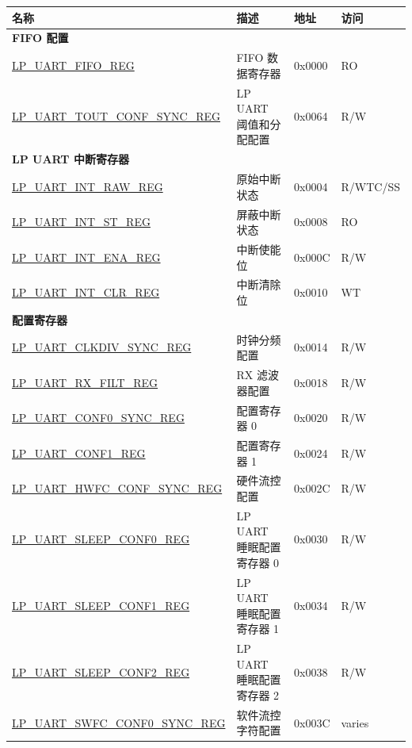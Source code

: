 \begin{longtable}{ | p{6.5cm} | p{7cm} | p{1.3cm} | p{1cm} | }
\hline\rowcolor{lightgray}
名称 & 描述 &  地址 & 访问 \\ \hline
\endhead
\multicolumn{4}{|l|}{\textbf{FIFO 配置}} \\ \hline
\hyperref[regdesc:LPUARTFIFOREG]{LP\_UART\_FIFO\_REG} & FIFO 数据寄存器 & 0x0000 & RO \\ \hline
\hyperref[regdesc:LPUARTTOUTCONFSYNCREG]{LP\_UART\_TOUT\_CONF\_SYNC\_REG} & LP UART 阈值和分配配置 & 0x0064 & R/W \\ \hline
\multicolumn{4}{|l|}{\textbf{LP UART 中断寄存器}} \\ \hline
\hyperref[regdesc:LPUARTINTRAWREG]{LP\_UART\_INT\_RAW\_REG} & 原始中断状态 & 0x0004 & R/WTC/SS \\ \hline
\hyperref[regdesc:LPUARTINTSTREG]{LP\_UART\_INT\_ST\_REG} & 屏蔽中断状态 & 0x0008 & RO \\ \hline
\hyperref[regdesc:LPUARTINTENAREG]{LP\_UART\_INT\_ENA\_REG} & 中断使能位 & 0x000C & R/W \\ \hline
\hyperref[regdesc:LPUARTINTCLRREG]{LP\_UART\_INT\_CLR\_REG} & 中断清除位 & 0x0010 & WT \\ \hline
\multicolumn{4}{|l|}{\textbf{配置寄存器}} \\ \hline
\hyperref[regdesc:LPUARTCLKDIVSYNCREG]{LP\_UART\_CLKDIV\_SYNC\_REG} & 时钟分频配置 & 0x0014 & R/W \\ \hline
\hyperref[regdesc:LPUARTRXFILTREG]{LP\_UART\_RX\_FILT\_REG} & RX 滤波器配置 & 0x0018 & R/W \\ \hline
\hyperref[regdesc:LPUARTCONF0SYNCREG]{LP\_UART\_CONF0\_SYNC\_REG} & 配置寄存器 0 & 0x0020 & R/W \\ \hline
\hyperref[regdesc:LPUARTCONF1REG]{LP\_UART\_CONF1\_REG} & 配置寄存器 1 & 0x0024 & R/W \\ \hline
\hyperref[regdesc:LPUARTHWFCCONFSYNCREG]{LP\_UART\_HWFC\_CONF\_SYNC\_REG} & 硬件流控配置 & 0x002C & R/W \\ \hline
\hyperref[regdesc:LPUARTSLEEPCONF0REG]{LP\_UART\_SLEEP\_CONF0\_REG} & LP UART 睡眠配置寄存器 0 & 0x0030 & R/W \\ \hline
\hyperref[regdesc:LPUARTSLEEPCONF1REG]{LP\_UART\_SLEEP\_CONF1\_REG} & LP UART 睡眠配置寄存器 1 & 0x0034 & R/W \\ \hline
\hyperref[regdesc:LPUARTSLEEPCONF2REG]{LP\_UART\_SLEEP\_CONF2\_REG} & LP UART 睡眠配置寄存器 2 & 0x0038 & R/W \\ \hline
\hyperref[regdesc:LPUARTSWFCCONF0SYNCREG]{LP\_UART\_SWFC\_CONF0\_SYNC\_REG} & 软件流控字符配置 & 0x003C & varies \\ \hline

\end{longtable}
